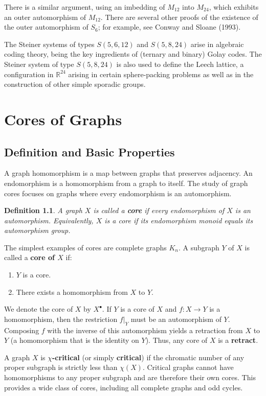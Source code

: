 \documentclass[12pt,a4paper,openany]{book}
\newtheorem{definition}{Definition}[section]
\newcommand{\Mtwelve}{M_{12}}
\newcommand{\Mtwentyfour}{M_{24}}
\newcommand{\R}{\mathbb{R}}
\begin{document}
There is a similar argument, using an imbedding of $\Mtwelve$ into $\Mtwentyfour$, which exhibits an outer automorphism of $\Mtwelve$. There are several other proofs of the existence of the outer automorphism of $S_6$; for example, see Conway and Sloane (1993).

The Steiner systems of types $S(5,6, 12)$ and $S(5, 8, 24)$ arise in algebraic coding theory, being the key ingredients of (ternary and binary) Golay codes. The Steiner system of type $S(5, 8, 24)$ is also used to define the Leech lattice, a configuration in $\R^{24}$ arising in certain sphere-packing problems as well as in the construction of other simple sporadic groups.

\chapter{Cores of Graphs}

\section{Definition and Basic Properties}

A graph homomorphism is a map between graphs that preserves adjacency. An endomorphism is a homomorphism from a graph to itself. The study of graph cores focuses on graphs where every endomorphism is an automorphism.

\begin{definition}
A graph $X$ is called a \textbf{core} if every endomorphism of $X$ is an automorphism. Equivalently, $X$ is a core if its endomorphism monoid equals its automorphism group.
\end{definition}

The simplest examples of cores are complete graphs $K_n$. A subgraph $Y$ of $X$ is called a \textbf{core of $X$} if:
\begin{enumerate}
    \item $Y$ is a core.
    \item There exists a homomorphism from $X$ to $Y$.
\end{enumerate}
We denote the core of $X$ by $X^\bullet$. If $Y$ is a core of $X$ and $f: X \to Y$ is a homomorphism, then the restriction $f|_Y$ must be an automorphism of $Y$. Composing $f$ with the inverse of this automorphism yields a retraction from $X$ to $Y$ (a homomorphism that is the identity on $Y$). Thus, any core of $X$ is a \textbf{retract}.

A graph $X$ is \textbf{$\chi$-critical} (or simply \textbf{critical}) if the chromatic number of any proper subgraph is strictly less than $\chi(X)$. Critical graphs cannot have homomorphisms to any proper subgraph and are therefore their own cores. This provides a wide class of cores, including all complete graphs and odd cycles.
\end{document}
